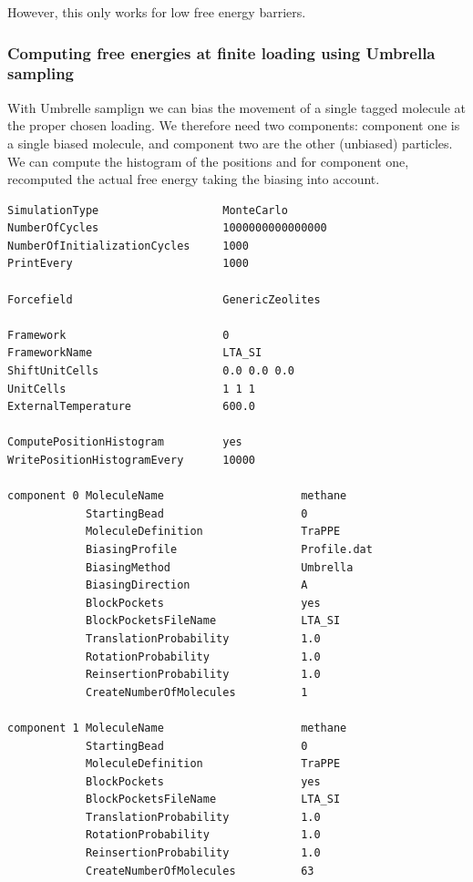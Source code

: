 However, this only works for low free energy barriers.

\subsubsection{Computing free energies at finite loading using Umbrella sampling}

With Umbrelle samplign we can bias the movement of a single tagged molecule at the proper chosen loading.
We therefore need two components: component one is a single biased molecule, and component two are the
other (unbiased) particles.
We can compute the histogram of the positions and for component one, recomputed the actual free energy
taking the biasing into account.

\begin{tiny}
\begin{verbatim}
SimulationType                   MonteCarlo
NumberOfCycles                   1000000000000000
NumberOfInitializationCycles     1000
PrintEvery                       1000

Forcefield                       GenericZeolites

Framework                        0
FrameworkName                    LTA_SI
ShiftUnitCells                   0.0 0.0 0.0
UnitCells                        1 1 1
ExternalTemperature              600.0

ComputePositionHistogram         yes
WritePositionHistogramEvery      10000

component 0 MoleculeName                     methane
            StartingBead                     0
            MoleculeDefinition               TraPPE
            BiasingProfile                   Profile.dat
            BiasingMethod                    Umbrella
            BiasingDirection                 A
            BlockPockets                     yes
            BlockPocketsFileName             LTA_SI
            TranslationProbability           1.0
            RotationProbability              1.0
            ReinsertionProbability           1.0
            CreateNumberOfMolecules          1

component 1 MoleculeName                     methane
            StartingBead                     0
            MoleculeDefinition               TraPPE
            BlockPockets                     yes
            BlockPocketsFileName             LTA_SI
            TranslationProbability           1.0
            RotationProbability              1.0
            ReinsertionProbability           1.0
            CreateNumberOfMolecules          63
\end{verbatim}
\end{tiny}

